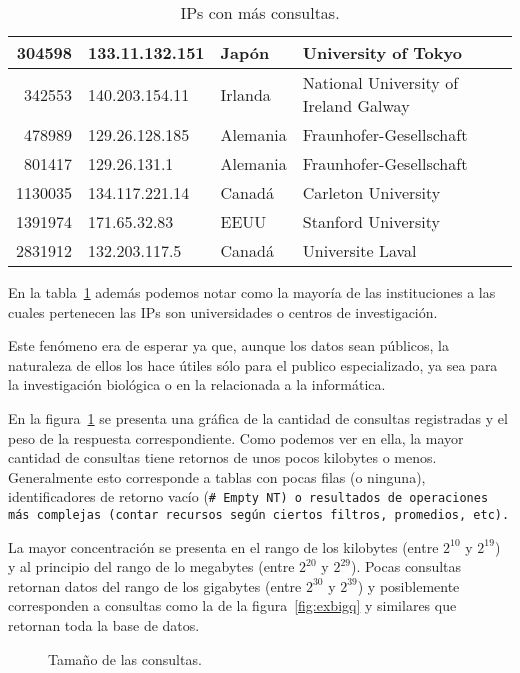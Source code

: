 \begin{table}[ht]
\begin{tabular}{|r|l|l|l|}
    304598  & 133.11.132.151  & Japón          
                   & University of Tokyo\\\hline
    342553  & 140.203.154.11  & Irlanda        
                   & National University of Ireland Galway\\\hline
    478989  & 129.26.128.185  & Alemania       
                   & Fraunhofer-Gesellschaft\\\hline
    801417  & 129.26.131.1    & Alemania       
                   & Fraunhofer-Gesellschaft\\\hline
    1130035 & 134.117.221.14  & Canadá         
                   & Carleton University\\\hline
    1391974 & 171.65.32.83    & EEUU 
                   & Stanford University\\\hline
    2831912 & 132.203.117.5   & Canadá         
                   & Universite Laval\\\hline
  \end{tabular}
  \caption{IPs con más consultas.}\label{tab:ips}
\end{table}

En la tabla~\ref{tab:ips} además podemos notar como la mayoría de las
instituciones a las cuales pertenecen las IPs son universidades o centros de
investigación.

Este fenómeno era de esperar ya que, aunque los datos sean públicos, la
naturaleza de ellos los hace útiles sólo para el publico especializado, ya sea
para la investigación biológica o en la relacionada a la informática.

En la figura~\ref{fig:size} se presenta una gráfica de la cantidad de consultas
registradas y el peso de la respuesta correspondiente. Como podemos ver en ella,
la mayor cantidad de consultas tiene retornos de unos pocos kilobytes o menos.
Generalmente esto corresponde a tablas con pocas filas (o ninguna),
identificadores de retorno vacío (\tt{\# Empty NT}) o resultados de operaciones
más complejas (contar recursos según ciertos filtros, promedios, etc).

La mayor concentración se presenta en el rango de los kilobytes (entre $2^{10}$ 
y $2^{19}$) y al principio del rango de lo megabytes (entre $2^{20}$ y $2^{29}$).
Pocas consultas retornan datos del rango de los gigabytes (entre $2^{30}$ y 
$2^{39}$) y posiblemente corresponden a consultas como la de la
figura~\ref{fig:exbigq} y similares que retornan toda la base de datos.

\begin{figure}[ht]
  \caption{Tamaño de las consultas.}\label{fig:size}
\end{figure}

